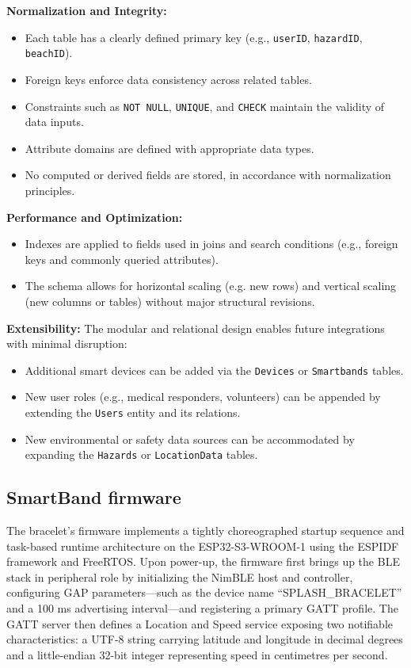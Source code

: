 \textbf{Normalization and Integrity:}
\begin{itemize}
    \item Each table has a clearly defined primary key (e.g., \texttt{userID}, \texttt{hazardID}, \texttt{beachID}).
    \item Foreign keys enforce data consistency across related tables.
    \item Constraints such as \texttt{NOT NULL}, \texttt{UNIQUE}, and \texttt{CHECK} maintain the validity of data inputs.
    \item Attribute domains are defined with appropriate data types.
    \item No computed or derived fields are stored, in accordance with normalization principles.
\end{itemize}

\textbf{Performance and Optimization:}
\begin{itemize}
    \item Indexes are applied to fields used in joins and search conditions (e.g., foreign keys and commonly queried attributes).
    \item The schema allows for horizontal scaling (e.g. new rows) and vertical scaling (new columns or tables) without major structural revisions.
\end{itemize}

\textbf{Extensibility:} The modular and relational design enables future integrations with minimal disruption:
\begin{itemize}
    \item Additional smart devices can be added via the \texttt{Devices} or \texttt{Smartbands} tables.
    \item New user roles (e.g., medical responders, volunteers) can be appended by extending the \texttt{Users} entity and its relations.
    \item New environmental or safety data sources can be accommodated by expanding the \texttt{Hazards} or \texttt{LocationData} tables.
\end{itemize}

\subsection{SmartBand firmware}

The bracelet’s firmware implements a tightly choreographed startup sequence and task-based runtime architecture on the ESP32-S3-WROOM-1 using the \ac{ESPIDF} framework and \ac{FreeRTOS}. Upon power-up, the firmware first brings up the \ac{BLE} stack in peripheral role by initializing the NimBLE host and controller, configuring \ac{GAP} parameters—such as the device name “SPLASH\_BRACELET” and a 100 ms advertising interval—and registering a primary \ac{GATT} profile. The \ac{GATT} server then defines a Location and Speed service exposing two notifiable characteristics: a UTF-8 string carrying latitude and longitude in decimal degrees and a little-endian 32-bit integer representing speed in centimetres per second.

